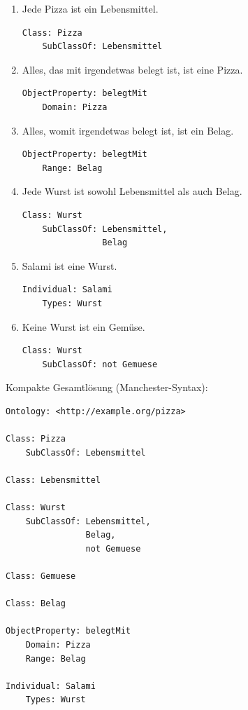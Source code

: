\documentclass[a4paper]{article}
\begin{document}
\begin{enumerate}
    \item Jede Pizza ist ein Lebensmittel.
    
\begin{lstlisting}
Class: Pizza
    SubClassOf: Lebensmittel
\end{lstlisting}
    \item Alles, das mit irgendetwas belegt ist, ist eine Pizza.
    
\begin{lstlisting}
ObjectProperty: belegtMit
    Domain: Pizza

\end{lstlisting}
    \item Alles, womit irgendetwas belegt ist, ist ein Belag.

\begin{lstlisting}
ObjectProperty: belegtMit
    Range: Belag

\end{lstlisting}
    \item Jede Wurst ist sowohl Lebensmittel als auch Belag.
    
\begin{lstlisting}
Class: Wurst
    SubClassOf: Lebensmittel,
                Belag
\end{lstlisting}
    \item Salami ist eine Wurst.
    
\begin{lstlisting}
Individual: Salami
    Types: Wurst
\end{lstlisting}
    \item Keine Wurst ist ein Gemüse.
    
\begin{lstlisting}
Class: Wurst
    SubClassOf: not Gemuese
\end{lstlisting}
\end{enumerate}

Kompakte Gesamtlösung (Manchester-Syntax):

\begin{lstlisting}
Ontology: <http://example.org/pizza>

Class: Pizza
    SubClassOf: Lebensmittel

Class: Lebensmittel

Class: Wurst
    SubClassOf: Lebensmittel,
                Belag,
                not Gemuese

Class: Gemuese

Class: Belag

ObjectProperty: belegtMit
    Domain: Pizza
    Range: Belag

Individual: Salami
    Types: Wurst
\end{lstlisting}
\end{document}
